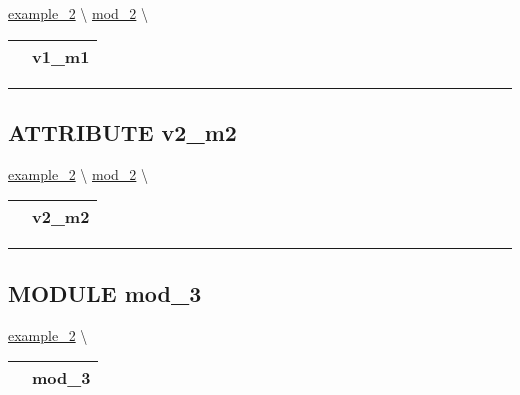 \hypertarget{ecldoc:intest.example_2.mod_2.v1_m1}{}
\hspace{0pt} \hyperlink{ecldoc:intest.example_2}{example_2} \textbackslash 
\hspace{0pt} \hyperlink{ecldoc:intest.example_2.mod_2}{mod_2} \textbackslash 

{\renewcommand{\arraystretch}{1.5}
\begin{tabularx}{\textwidth}{|>{\raggedright\arraybackslash}l|X|}
\hline
\hspace{0pt}\mytexttt{\color{red} } & \textbf{v1\_m1} \\
\hline
\end{tabularx}
}

\par


\rule{\linewidth}{0.5pt}
\subsection*{\textsf{\colorbox{headtoc}{\color{white} ATTRIBUTE}
v2\_m2}}

\hypertarget{ecldoc:intest.example_2.mod_2.v2_m2}{}
\hspace{0pt} \hyperlink{ecldoc:intest.example_2}{example_2} \textbackslash 
\hspace{0pt} \hyperlink{ecldoc:intest.example_2.mod_2}{mod_2} \textbackslash 

{\renewcommand{\arraystretch}{1.5}
\begin{tabularx}{\textwidth}{|>{\raggedright\arraybackslash}l|X|}
\hline
\hspace{0pt}\mytexttt{\color{red} } & \textbf{v2\_m2} \\
\hline
\end{tabularx}
}

\par


\rule{\linewidth}{0.5pt}


\subsection*{\textsf{\colorbox{headtoc}{\color{white} MODULE}
mod\_3}}

\hypertarget{ecldoc:intest.example_2.mod_3}{}
\hspace{0pt} \hyperlink{ecldoc:intest.example_2}{example_2} \textbackslash 

{\renewcommand{\arraystretch}{1.5}
\begin{tabularx}{\textwidth}{|>{\raggedright\arraybackslash}l|X|}
\hline
\hspace{0pt}\mytexttt{\color{red} } & \textbf{mod\_3} \\
\hline
\end{tabularx}
}

